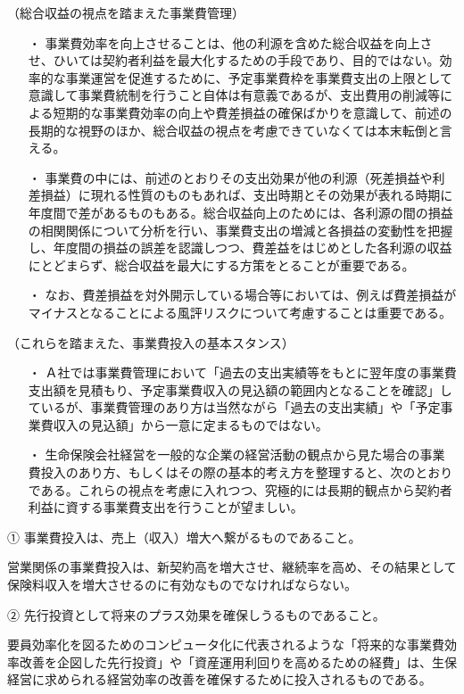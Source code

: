 \documentclass[report,gutter=10mm,fore-edge=10mm,uplatex,dvipdfmx]{jlreq}
\begin{document}
（総合収益の視点を踏まえた事業費管理）

\begin{itemize}
 \item [・]  事業費効率を向上させることは、他の利源を含めた総合収益を向上させ、ひいては契約者利益を最大化するための手段であり、目的ではない。効率的な事業運営を促進するために、予定事業費枠を事業費支出の上限として意識して事業費統制を行うこと自体は有意義であるが、支出費用の削減等による短期的な事業費効率の向上や費差損益の確保ばかりを意識して、前述の長期的な視野のほか、総合収益の視点を考慮できていなくては本末転倒と言える。
 \item [・]  事業費の中には、前述のとおりその支出効果が他の利源（死差損益や利差損益）に現れる性質のものもあれば、支出時期とその効果が表れる時期に年度間で差があるものもある。総合収益向上のためには、各利源の間の損益の相関関係について分析を行い、事業費支出の増減と各損益の変動性を把握し、年度間の損益の誤差を認識しつつ、費差益をはじめとした各利源の収益にとどまらず、総合収益を最大にする方策をとることが重要である。
 \item [・]  なお、費差損益を対外開示している場合等においては、例えば費差損益がマイナスとなることによる風評リスクについて考慮することは重要である。
\end{itemize}

（これらを踏まえた、事業費投入の基本スタンス）

\begin{itemize}
 \item [・]  Ａ社では事業費管理において「過去の支出実績等をもとに翌年度の事業費支出額を見積もり、予定事業費収入の見込額の範囲内となることを確認」しているが、事業費管理のあり方は当然ながら「過去の支出実績」や「予定事業費収入の見込額」から一意に定まるものではない。
 \item [・]  生命保険会社経営を一般的な企業の経営活動の観点から見た場合の事業費投入のあり方、もしくはその際の基本的考え方を整理すると、次のとおりである。これらの視点を考慮に入れつつ、究極的には長期的観点から契約者利益に資する事業費支出を行うことが望ましい。
\end{itemize}

① 事業費投入は、売上（収入）増大へ繋がるものであること。

営業関係の事業費投入は、新契約高を増大させ、継続率を高め、その結果として保険料収入を増大させるのに有効なものでなければならない。

② 先行投資として将来のプラス効果を確保しうるものであること。

要員効率化を図るためのコンピュータ化に代表されるような「将来的な事業費効率改善を企図した先行投資」や「資産運用利回りを高めるための経費」は、生保経営に求められる経営効率の改善を確保するために投入されるものである。
\end{document}
